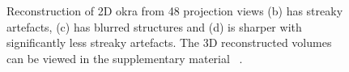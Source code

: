 \documentclass[journal]{IEEEtran}
\begin{document}
\begin{figure}[!h]
{}
\caption{Reconstruction of 2D okra from 48 projection views
   (b) has streaky artefacts, (c) has blurred structures and (d) is sharper with significantly less streaky artefacts. The 3D reconstructed volumes can be viewed  in the supplementary material ~\cite{supp_paper}.}
\label{fig:okra_3D_results}
\end{figure}

\end{document}

